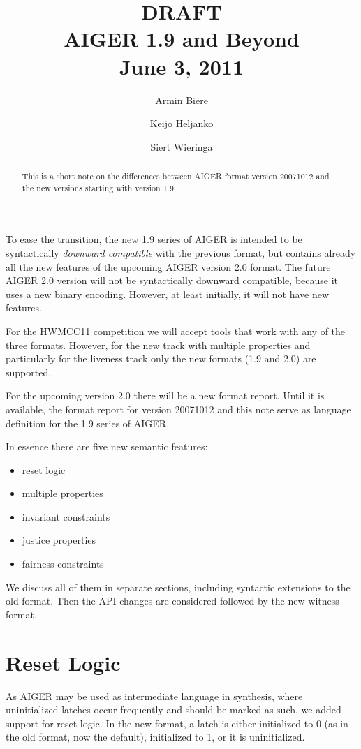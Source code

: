 \documentclass{llncs}
\title{
{\color{blue}\large DRAFT}\\
  AIGER 1.9 and Beyond \\
{\color{blue}\large June 3, 2011}}
\author{Armin Biere\inst{1} \and
Keijo Heljanko\inst{2} \and
Siert Wieringa\inst{2}}
\institute{Johannes Kepler University, Austria \and Alto University, Finland}
\begin{document}
\maketitle
\begin{abstract}
This is a short note on the differences between AIGER format version 20071012
and the new versions starting with version 1.9.
\end{abstract}
To ease the transition, the new 1.9 series of AIGER is intended to be
syntactically \emph{downward compatible} with the previous format, but contains
already all the new features of the upcoming AIGER version 2.0 format.  The
future AIGER 2.0 version will not be syntactically downward compatible, because
it uses a new binary encoding.  However, at least initially, it will not have
new features.

For the HWMCC11 competition we will accept tools that work with any of
the three formats.  However, for the new track with multiple properties and 
particularly for the liveness track only the new formats (1.9 and 2.0) are
supported.

For the upcoming version 2.0 there will be a new format report. Until it is
available, the format report for version 20071012 and this note serve as
language definition for the 1.9 series of AIGER.  

In essence there are five new semantic features:

\begin{itemize}
\item reset logic
\item multiple properties
\item invariant constraints
\item justice properties
\item fairness constraints
\end{itemize}

We discuss all of them in separate sections, including syntactic
extensions to the old format.   Then the API changes are considered followed
by the new witness format.

\section{Reset Logic}

As AIGER may be used as intermediate language in synthesis, where
uninitialized latches occur frequently and should be marked as such, we
added support for reset logic.  In the new format, a latch is either
initialized to 0 (as in the old format, now the default), initialized to 1,
or it is uninitialized.
\end{document}
